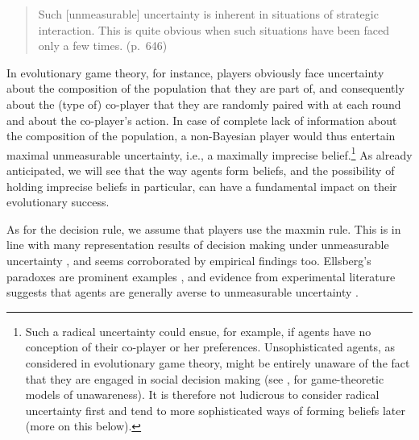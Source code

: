 \documentclass[fleqn,reqno,12pt]{article}
\theoremstyle{Satz}
\theoremstyle{Bsp}
\begin{document}
\begin{quote}
  Such [unmeasurable] uncertainty is inherent in situations of strategic interaction. This is quite obvious
  when such situations have been faced only a few times. (p.~646)
\end{quote}

\noindent In evolutionary game theory, for instance, players obviously face uncertainty
about the composition of the population that they are part of, and consequently about the (type of)
co-player that they are randomly paired with at each round and about the co-player's action. In
case of complete lack of information about the composition of the population, a non-Bayesian player would thus entertain maximal
unmeasurable uncertainty, i.e., a maximally imprecise belief.\footnote{Such a radical
  uncertainty could ensue, for example, if agents have no conception of their co-player or her
  preferences. Unsophisticated agents, as considered in evolutionary game theory, might be
  entirely unaware of the fact that they are engaged in social decision making (see \cite{HeifetzMeier2009:Dynamic-Unaware}, for
  game-theoretic models of unawareness). It is therefore
  not ludicrous to consider radical uncertainty first and tend to more
  sophisticated ways of forming beliefs later (more on this below).} As already anticipated, we
will see that the way agents form beliefs, and the possibility of holding imprecise beliefs
in particular, can have a fundamental impact on their evolutionary success.

As for the decision rule, we assume that players use the maxmin rule. This is in line with many
representation results of decision making under unmeasurable uncertainty
\citep[e.g.,][]{gilsch89,GhirMar02}, and seems corroborated by empirical findings
too. Ellsberg's paradoxes are prominent examples \citep{ells61}, and evidence from experimental
literature suggests that agents are generally averse to unmeasurable uncertainty
\citep[e.g.,][]{TrautKuil16}.
\end{document}
